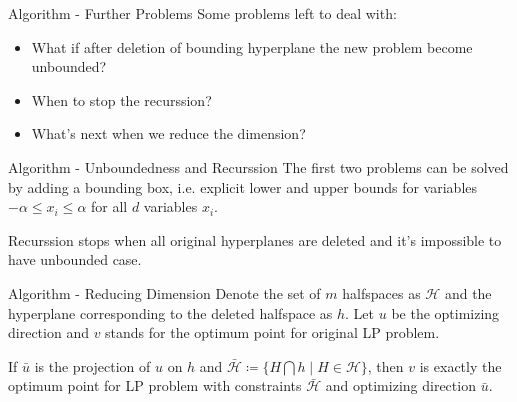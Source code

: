 \documentclass{beamer}
\begin{document}
\begin{frame}{Algorithm - Further Problems}
    Some problems left to deal with:

    \begin{itemize}
        \item What if after deletion of bounding hyperplane the new problem become unbounded?
        \item When to stop the recurssion?
        \item What's next when we reduce the dimension?
    \end{itemize}
\end{frame}
\begin{frame}{Algorithm - Unboundedness and Recurssion}
    The first two problems can be solved by adding a bounding box, i.e. explicit lower and upper bounds for
    variables $-\alpha \le x_i \le \alpha$ for all $d$ variables $x_i$.
    
    \vspace{\baselineskip}

    Recurssion stops when all original hyperplanes are deleted and it's impossible to have unbounded case.

\end{frame}
\begin{frame}{Algorithm - Reducing Dimension}
    Denote the set of $m$ halfspaces as $\mathcal{H}$ and the hyperplane corresponding to the deleted halfspace as $h$.
    Let $u$ be the optimizing direction and $v$ stands for the optimum point for original LP problem.
    
    \vspace{\baselineskip}
    
    If $\bar{u}$ is the projection of $u$ on $h$ and $\bar{\mathcal{H}} \coloneq \{H \bigcap h \mid H \in \mathcal{H}\}$, then $v$ is exactly 
    the optimum point for LP problem with constraints $\bar{\mathcal{H}}$ and optimizing direction $\bar{u}$.
\end{frame}
\end{document}
